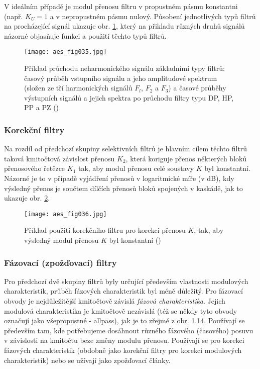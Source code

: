         V ideálním případě je modul přenosu filtru v propustném pásmu konstantni (např. \(K_U = 1\)
        a v nepropustném pásmu nulový. Působení jednotlivých typů filtrů na procházející signál
        ukazuje obr. \ref{aes:fig035}, který na přikladu různých druhů signálů názorné objasňuje
        funkci a použití těchto typů filtrů. 

        \begin{figure}[ht!]  %
          \centering
          \texttt{[image: aes\_fig035.jpg]}
          \caption{Příklad průchodu neharmonického signálu základními typy filtrů: časový průběh
                  vstupního signálu a jeho amplitudové spektrum (složen ze tří harmonických
                  signálů \(F_l\), \(F_2\) a \(F_3\)) a časové průběhy výstupních signálů a jejich
                  spektra po průchodu filtry typu DP, HP, PP a PZ
                  (\cite[s.~35]{HajekSedlacek2002})}
          \label{aes:fig035}    
        \end{figure}
        
      \subsubsection{Korekční filtry}
        Na rozdíl od předchozí skupiny selektivních filtrů je hlavním cílem těchto filtrů taková
        kmitočtová závislost přenosu \(K_2\), která koriguje přenos některých bloků přenosového
        řetězce \(K_1\) tak, aby modul přenosu celé soustavy \(K\) byl konstantní. Názorné je to v
        případě vyjádření přenosů v logaritmické míře (v dB), kdy výsledný přenos je součtem dílčích
        přenosů bloků spojených v kaskádě, jak to ukazuje obr. \ref{aes:fig036}. 

        \begin{figure}[ht!]  %
          \centering
          \texttt{[image: aes\_fig036.jpg]}
          \caption{Příklad použití korekčního filtru pro korekci přenosu \(K\), tak, aby výsledný
                  modul přenosu \(K\) byl konstantní (\cite[s.~36]{HajekSedlacek2002})}
          \label{aes:fig036}    
        \end{figure}

        \subsubsection{Fázovací (zpožďovací) filtry}
          Pro předchozí dvě skupiny filtrů byly určující především vlastnosti modulových
          charakteristik, průběh fázových charakteristik byl méně důležitý. Pro fázovací obvody je
          nejdůležitější kmitočtově závislá \emph{fázová charakteristika}. Jejich modulová
          charakteristika je kmitočtově nezávislá (též se někdy tyto obvody označují jako
          všepropustné - allpass), jak je to zřejmé z obr. 1.14. Používají se především tam, kde
          potřebujeme dosáhnout různého fázového (časového) posuvu v závislosti na kmitočtu beze
          změny modulu přenosu. Používají se pro korekci fázových charakteristik (obdobně jako
          korekční filtry pro korekci modulových charakteristik) nebo se užívají jako zpožďovací
          články. 

